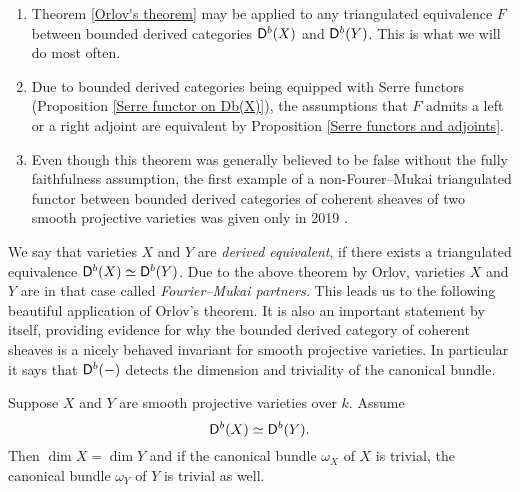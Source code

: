 \begin{remark}
    \begin{enumerate}[label = (\roman*)]
        \item Theorem \ref{Orlov's theorem} may be applied to any triangulated equivalence $F$ between bounded derived categories $\mathsf{D}^b(X)$ and $\mathsf{D}^b(Y)$. This is what we will do most often. 
        \item Due to bounded derived categories being equipped with Serre functors (Proposition \ref{Serre functor on Db(X)}), the assumptions that $F$ admits a left or a right adjoint are equivalent by Proposition \ref{Serre functors and adjoints}.
        \item{Even though this theorem was generally believed to be false without the fully faithfulness assumption, the first example of a non-Fourer--Mukai triangulated functor between bounded derived categories of coherent sheaves of two smooth projective varieties was given only in 2019 \cite{RizzardoVanDenBerghNeeman2019}.}
    \end{enumerate}
\end{remark}

We say that varieties $X$ and $Y$ are \emph{derived equivalent}, if there exists a triangulated equivalence $\mathsf{D}^b(X) \simeq \mathsf{D}^b(Y)$. Due to the above theorem by Orlov, varieties $X$ and $Y$ are in that case called \emph{Fourier--Mukai partners.}
This leads us to the following beautiful application of Orlov's theorem. It is also an important statement by itself, providing evidence for why the bounded derived category of coherent sheaves is a nicely behaved invariant for smooth projective varieties. In particular it says that $\mathsf{D}^b(-)$ detects the dimension and triviality of the canonical bundle.  
\begin{theorem}
    \label{Db detects dimension and triviality of canonical bundle}
    Suppose $X$ and $Y$ are smooth projective varieties over $k$. Assume
    \[
        \mathsf{D}^b(X) \simeq \mathsf{D}^b(Y).
    \]
    Then $\dim X = \dim Y$ and if the canonical bundle $\omega_X$ of $X$ is trivial, the canonical bundle $\omega_Y$ of $Y$ is trivial as well.
\end{theorem}

